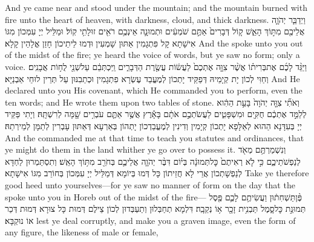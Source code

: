 {And ye came near and stood under the mountain; and the mountain burned with fire unto the heart of heaven, with darkness, cloud, and thick darkness.}{}
{וַיְדַבֵּ֧ר יְהֹוָ֛ה אֲלֵיכֶ֖ם מִתּ֣וֹךְ הָאֵ֑שׁ ק֤וֹל דְּבָרִים֙ אַתֶּ֣ם שֹׁמְעִ֔ים וּתְמוּנָ֛ה אֵינְכֶ֥ם רֹאִ֖ים זוּלָתִ֥י קֽוֹל׃}
{וּמַלֵּיל יְיָ עִמְּכוֹן מִגּוֹ אִישָׁתָא קָל פִּתְגָמִין אַתּוּן שָׁמְעִין וּדְמוּ לֵיתֵיכוֹן חָזַן אֱלָהֵין קָלָא׃}
{And the \lord\space spoke unto you out of the midst of the fire; ye heard the voice of words, but ye saw no form; only a voice.}{}
{וַיַּגֵּ֨ד לָכֶ֜ם אֶת\maqqaf בְּרִית֗וֹ אֲשֶׁ֨ר צִוָּ֤ה אֶתְכֶם֙ לַעֲשׂ֔וֹת עֲשֶׂ֖רֶת הַדְּבָרִ֑ים וַֽיִּכְתְּבֵ֔ם עַל\maqqaf שְׁנֵ֖י לֻח֥וֹת אֲבָנִֽים׃}
{וְחַוִּי לְכוֹן יָת קְיָמֵיהּ דְּפַקֵּיד יָתְכוֹן לְמֶעֱבַד עֶשְׂרָא פִתְגָמִין וּכְתַבִנּוּן עַל תְּרֵין לוּחֵי אַבְנַיָּא׃}
{And He declared unto you His covenant, which He commanded you to perform, even the ten words; and He wrote them upon two tables of stone.}{}
{וְאֹתִ֞י צִוָּ֤ה יְהֹוָה֙ בָּעֵ֣ת הַהִ֔וא לְלַמֵּ֣ד אֶתְכֶ֔ם חֻקִּ֖ים וּמִשְׁפָּטִ֑ים לַעֲשֹׂתְכֶ֣ם אֹתָ֔ם בָּאָ֕רֶץ אֲשֶׁ֥ר אַתֶּ֛ם עֹבְרִ֥ים שָׁ֖מָּה לְרִשְׁתָּֽהּ׃}
{וְיָתִי פַּקֵּיד יְיָ בְּעִדָּנָא הַהוּא לְאַלָּפָא יָתְכוֹן קְיָמִין וְדִינִין לְמֶעֱבַדְכוֹן יָתְהוֹן בְּאַרְעָא דְּאַתּוּן עָבְרִין לְתַמָּן לְמֵירְתַהּ׃}
{And the \lord\space commanded me at that time to teach you statutes and ordinances, that ye might do them in the land whither ye go over to possess it.}{}
{וְנִשְׁמַרְתֶּ֥ם מְאֹ֖ד לְנַפְשֹׁתֵיכֶ֑ם כִּ֣י לֹ֤א רְאִיתֶם֙ כׇּל\maqqaf תְּמוּנָ֔ה בְּי֗וֹם דִּבֶּ֨ר יְהֹוָ֧ה אֲלֵיכֶ֛ם בְּחֹרֵ֖ב מִתּ֥וֹךְ הָאֵֽשׁ׃}
{וְתִסְתַּמְרוּן לַחְדָּא לְנַפְשָׁתְכוֹן אֲרֵי לָא חֲזֵיתוֹן כָּל דְּמוּ בְּיוֹמָא דְּמַלֵּיל יְיָ עִמְּכוֹן בְּחוֹרֵב מִגּוֹ אִישָׁתָא׃}
{Take ye therefore good heed unto yourselves—for ye saw no manner of form on the day that the \lord\space spoke unto you in Horeb out of the midst of the fire—}{}
{פֶּ֨ן\maqqaf תַּשְׁחִת֔וּן וַעֲשִׂיתֶ֥ם לָכֶ֛ם פֶּ֖סֶל תְּמוּנַ֣ת כׇּל\maqqaf סָ֑מֶל תַּבְנִ֥ית זָכָ֖ר א֥וֹ נְקֵבָֽה׃}
{דִּלְמָא תְחַבְּלוּן וְתַעְבְּדוּן לְכוֹן צֵילֶם דְּמוּת כָּל צוּרָא דְּמוּת דְּכַר אוֹ נוּקְבָּא׃}
{lest ye deal corruptly, and make you a graven image, even the form of any figure, the likeness of male or female,}{}
